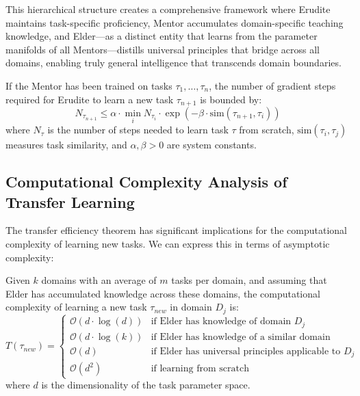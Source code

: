 This hierarchical structure creates a comprehensive framework where Erudite maintains task-specific proficiency, Mentor accumulates domain-specific teaching knowledge, and Elder—as a distinct entity that learns from the parameter manifolds of all Mentors—distills universal principles that bridge across all domains, enabling truly general intelligence that transcends domain boundaries.

\begin{theorem}
If the Mentor has been trained on tasks $\tau_1, \ldots, \tau_n$, the number of gradient steps required for Erudite to learn a new task $\tau_{n+1}$ is bounded by:
\begin{equation}
N_{\tau_{n+1}} \leq \alpha \cdot \min_i N_{\tau_i} \cdot \exp\left(-\beta \cdot \mathrm{sim}(\tau_{n+1}, \tau_i)\right)
\end{equation}
where $N_{\tau}$ is the number of steps needed to learn task $\tau$ from scratch, $\mathrm{sim}(\tau_i, \tau_j)$ measures task similarity, and $\alpha, \beta > 0$ are system constants.
\end{theorem}

\subsection{Computational Complexity Analysis of Transfer Learning}

The transfer efficiency theorem has significant implications for the computational complexity of learning new tasks. We can express this in terms of asymptotic complexity:

\begin{theorem}
Given $k$ domains with an average of $m$ tasks per domain, and assuming that Elder has accumulated knowledge across these domains, the computational complexity of learning a new task $\tau_{new}$ in domain $D_j$ is:
\begin{equation}
T(\tau_{new}) = 
\begin{cases}
\mathcal{O}(d \cdot \log(d)) & \text{if Elder has knowledge of domain $D_j$} \\
\mathcal{O}(d \cdot \log(k)) & \text{if Elder has knowledge of a similar domain} \\
\mathcal{O}(d) & \text{if Elder has universal principles applicable to $D_j$} \\
\mathcal{O}(d^2) & \text{if learning from scratch}
\end{cases}
\end{equation}
where $d$ is the dimensionality of the task parameter space.
\end{theorem}

